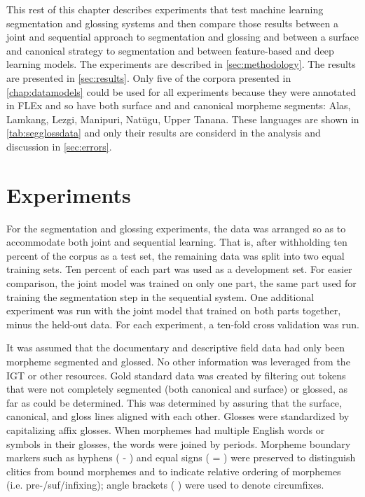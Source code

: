 This rest of this chapter describes experiments that test machine learning segmentation and glossing systems and then compare those results between a joint and sequential approach to segmentation and glossing and between a surface and canonical strategy to segmentation and between feature-based and deep learning models.  The experiments are described in \autoref{sec:methodology}. The results are presented in \autoref{sec:results}. Only five of the corpora presented in \autoref{chap:datamodels} could be used for all experiments because they were annotated in FLEx and so have both surface and and canonical morpheme segments: Alas, Lamkang, Lezgi, Manipuri, Nat\"ugu, Upper Tanana. These languages are shown in \autoref{tab:segglossdata} and only their results are considerd in the analysis and discussion in \autoref{sec:errors}.


\section{Experiments}
\label{sec:methodology}

For the segmentation and glossing experiments, the data was arranged so as to accommodate both joint and sequential learning. That is, after withholding ten percent of the corpus as a test set, the remaining data was split into two equal training sets.  Ten percent of each part was used as a development set. For easier comparison, the joint model was trained on only one part, the same part used for training the segmentation step in the sequential system. One additional experiment was run with the joint model that trained on both parts together, minus the held-out data. For each experiment, a ten-fold cross validation was run. 

It was assumed that the documentary and descriptive field data had only been morpheme segmented and glossed. No other information was leveraged from the IGT or other resources. Gold standard data was created by filtering out tokens that were not completely segmented (both canonical and surface) or glossed, as far as could be determined. This was determined by assuring that the surface, canonical, and gloss lines aligned with each other. 
Glosses were standardized by capitalizing affix glosses. When morphemes had multiple English words or symbols in their glosses, the words were joined by periods.
Morpheme boundary markers such as hyphens ( - ) and equal signs ( = ) were preserved to distinguish clitics from bound morphemes and to indicate relative ordering of morphemes (i.e. pre-/suf/infixing); angle brackets ( \textlangle{}\textrangle{} ) were used to denote circumfixes. 

